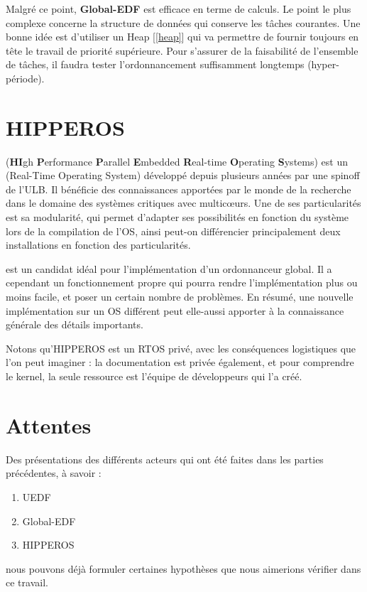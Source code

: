 	
	Malgré ce point, \textbf{Global-EDF} est \og{}efficace\fg{} en terme de calculs.
	Le point le plus complexe concerne la structure de données qui conserve les 
	tâches courantes. Une bonne idée est d'utiliser un Heap [\ref*{heap}] qui 
	va permettre de fournir toujours en tête le travail de priorité supérieure.
	Pour s'assurer de la faisabilité de l'ensemble de tâches, 
	il faudra tester l'ordonnancement suffisamment longtemps (hyper-période).\newline

		
\section{HIPPEROS}
	 (\textbf{HI}gh \textbf{P}erformance \textbf{P}arallel \textbf{E}mbedded \textbf{R}eal-time \textbf{O}perating \textbf{S}ystems)
	est un  (Real-Time Operating System) développé depuis plusieurs années par une spinoff de l'ULB.
	Il bénéficie des connaissances apportées par le monde de la recherche dans 
	le domaine des systèmes critiques avec multic\oe{}urs. Une de ses particularités 
	est sa modularité, qui permet d'adapter ses possibilités en fonction du système 
	lors de la compilation de l'OS, ainsi peut-on différencier principalement 
	deux installations en fonction des particularités. 
	
	 est un candidat idéal pour l'implémentation d'un ordonnanceur 
	global. Il a cependant un fonctionnement propre qui pourra rendre l'implémentation 
	plus ou moins facile, et poser un certain nombre de problèmes. 
	En résumé, une nouvelle implémentation sur un OS différent 
	peut elle-aussi apporter à la connaissance générale des détails importants.\newline
	
	Notons qu'HIPPEROS est un RTOS privé, avec les conséquences logistiques que l'on peut 
	imaginer : la documentation est privée également, et pour comprendre le kernel, la 
	seule ressource est l'équipe de développeurs qui l'a créé. 
	
		
\section{Attentes}

	Des présentations des différents acteurs qui ont été faites dans les parties précédentes, à savoir :
	\begin{enumerate}
		\setlength\itemsep{0.1em}
		\item UEDF
		\item Global-EDF
		\item HIPPEROS
	\end{enumerate}
	nous pouvons déjà formuler certaines hypothèses que nous aimerions vérifier dans ce travail. \newline
	
